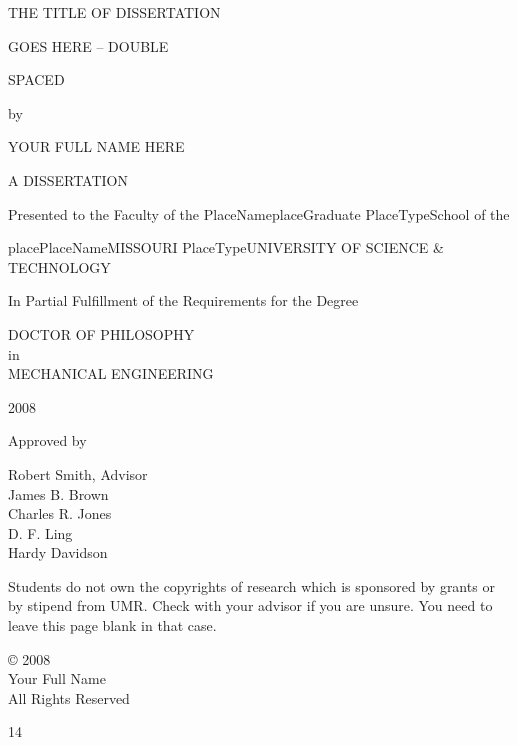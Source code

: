 \documentclass{article}
\begin{document}
\newpage
\begin{center}
THE TITLE OF DISSERTATION

GOES HERE -- DOUBLE

SPACED


\end{center}


\begin{center}
by

YOUR FULL NAME HERE


\end{center}


\begin{center}
A DISSERTATION

Presented to the Faculty of the PlaceNameplaceGraduate PlaceTypeSchool 
of the 

placePlaceNameMISSOURI PlaceTypeUNIVERSITY OF SCIENCE \& TECHNOLOGY

In Partial Fulfillment of the Requirements for the Degree


\end{center}

\begin{center}
DOCTOR OF PHILOSOPHY\\
in\\
MECHANICAL ENGINEERING


\end{center}


\begin{center}
2008

Approved by

Robert Smith, Advisor\\
James B. Brown\\
Charles R. Jones\\
D. F. Ling\\
Hardy Davidson


\end{center}


Students do not own the copyrights of research which is sponsored 
by grants or by stipend from UMR. Check with your advisor if 
you are unsure. You need to leave this page blank in that case.


\begin{center}
{\copyright} 2008\\
Your Full Name\\
All Rights Reserved\\

\end{center}

14
\end{document}
